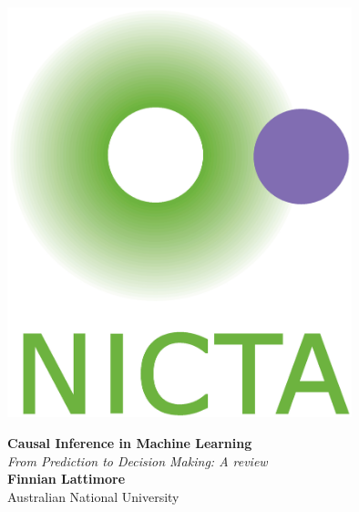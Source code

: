 \documentclass[b0,landscape,25pt]{sciposter}
\begin{document}
\def\ci{\perp\!\!\!\perp}

\begin{minipage}[t]{0.15\linewidth}%
\includegraphics[width=10cm]{nicta_logo2.jpg} %
\end{minipage}
\begin{minipage}[b]{0.70\linewidth}
\centering
\veryHuge \color{NavyBlue} \textbf{Causal Inference in Machine Learning} \color{Black}\\ %
\Huge\textit{From Prediction to Decision Making: A review}\\[1cm] %
\huge \textbf{Finnian Lattimore}\\ %
\huge Australian National University\\ %
\end{minipage}
\begin{minipage}[t]{0.15\linewidth}\end{minipage}
\end{document}
